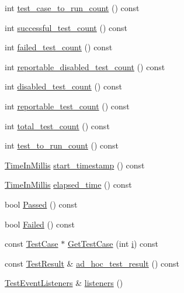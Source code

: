 \begin{DoxyCompactItemize}
int \hyperlink{classtesting_1_1UnitTest_abb7330165eb5be7beac3f7e6ced5fcdd}{test\+\_\+case\+\_\+to\+\_\+run\+\_\+count} () const 
\item 
int \hyperlink{classtesting_1_1UnitTest_a4795d58351f03498d5823a743b0722c5}{successful\+\_\+test\+\_\+count} () const 
\item 
int \hyperlink{classtesting_1_1UnitTest_aeda0f8ca87adf65f634c3d6d9ab98598}{failed\+\_\+test\+\_\+count} () const 
\item 
int \hyperlink{classtesting_1_1UnitTest_aa5eaf98c5d9cc0afe501ac03e6414188}{reportable\+\_\+disabled\+\_\+test\+\_\+count} () const 
\item 
int \hyperlink{classtesting_1_1UnitTest_a4cbd084447b74784d1bb85c1ed4b96d5}{disabled\+\_\+test\+\_\+count} () const 
\item 
int \hyperlink{classtesting_1_1UnitTest_aa32cb4f3cd34564a5c641bd409f8f83b}{reportable\+\_\+test\+\_\+count} () const 
\item 
int \hyperlink{classtesting_1_1UnitTest_a54315b233d354693b9aa1184cf2996de}{total\+\_\+test\+\_\+count} () const 
\item 
int \hyperlink{classtesting_1_1UnitTest_a953a52f89898a04ee4a4e08469407cd3}{test\+\_\+to\+\_\+run\+\_\+count} () const 
\item 
\hyperlink{namespacetesting_a992de1d091ce660f451d1e8b3ce30fd6}{Time\+In\+Millis} \hyperlink{classtesting_1_1UnitTest_aa7d2853c08558b685df818d47f44a10c}{start\+\_\+timestamp} () const 
\item 
\hyperlink{namespacetesting_a992de1d091ce660f451d1e8b3ce30fd6}{Time\+In\+Millis} \hyperlink{classtesting_1_1UnitTest_aeff5643edc3624e49085e2850512a7de}{elapsed\+\_\+time} () const 
\item 
bool \hyperlink{classtesting_1_1UnitTest_a4ef49e958702bf741e7eaa4864e28a48}{Passed} () const 
\item 
bool \hyperlink{classtesting_1_1UnitTest_ad7711156d07d6037d8f497e5c385f78d}{Failed} () const 
\item 
const \hyperlink{classtesting_1_1TestCase}{Test\+Case} $\ast$ \hyperlink{classtesting_1_1UnitTest_a3f324a8067d56044b56cec58d1edf7ac}{Get\+Test\+Case} (int \hyperlink{gtest__output__test__golden__lin_8txt_a7e98b8a17c0aad30ba64d47b74e2a6c1}{i}) const 
\item 
const \hyperlink{classtesting_1_1TestResult}{Test\+Result} \& \hyperlink{classtesting_1_1UnitTest_ad9f058c36dab7e276322969160ed6f06}{ad\+\_\+hoc\+\_\+test\+\_\+result} () const 
\item 
\hyperlink{classtesting_1_1TestEventListeners}{Test\+Event\+Listeners} \& \hyperlink{classtesting_1_1UnitTest_aac10085cf7c0d1751306db10cdd953cb}{listeners} ()
\end{DoxyCompactItemize}
